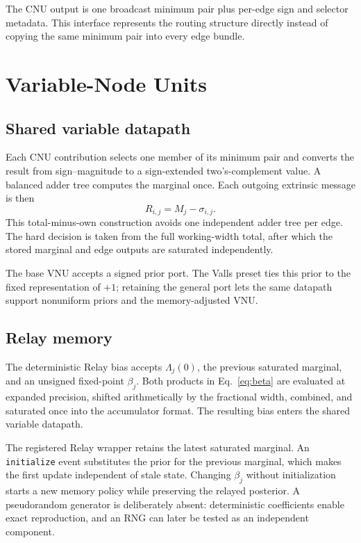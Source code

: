 \documentclass[10pt,conference]{IEEEtran}
\begin{document}
The CNU output is one broadcast minimum pair plus per-edge sign and selector
metadata.  This interface represents the routing structure directly instead
of copying the same minimum pair into every edge bundle.

\section{Variable-Node Units}
\subsection{Shared variable datapath}
Each CNU contribution selects one member of its minimum pair and converts the
result from sign--magnitude to a sign-extended two's-complement value.  A
balanced adder tree computes the marginal once.  Each outgoing extrinsic
message is then
\begin{equation}
 R_{i,j}=M_j-\sigma_{i,j}.
\end{equation}
This total-minus-own construction avoids one independent adder tree per edge.
The hard decision is taken from the full working-width total, after which the
stored marginal and edge outputs are saturated independently.

The base VNU accepts a signed prior port.  The Valls preset ties this prior to
the fixed representation of $+1$; retaining the general port lets the same
datapath support nonuniform priors and the memory-adjusted VNU.

\subsection{Relay memory}
The deterministic Relay bias accepts $\Lambda_j(0)$, the previous saturated
marginal, and an unsigned fixed-point $\beta_j$.  Both products in
Eq.~\eqref{eq:beta} are evaluated at expanded precision, shifted arithmetically
by the fractional width, combined, and saturated once into the accumulator
format.  The resulting bias enters the shared variable datapath.

The registered Relay wrapper retains the latest saturated marginal.  An
\texttt{initialize} event substitutes the prior for the previous marginal,
which makes the first update independent of stale state.  Changing $\beta_j$
without initialization starts a new memory policy while preserving the relayed
posterior.  A pseudorandom generator is deliberately absent: deterministic
coefficients enable exact reproduction, and an RNG can later be tested as an
independent component.
\end{document}
